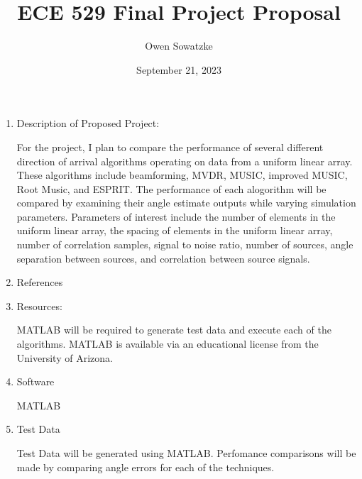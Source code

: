 \documentclass{article}
\title{ECE 529 Final Project Proposal}
\author{Owen Sowatzke}
\date{September 21, 2023}
\begin{document}
	\maketitle

	\begin{enumerate}
		\item Description of Proposed Project:
		
			For the project, I plan to compare the performance of several different direction of arrival algorithms operating on data from a uniform linear array. These algorithms include beamforming, MVDR, MUSIC, improved MUSIC, Root Music, and ESPRIT. The performance of each alogorithm will be compared by examining their angle estimate outputs while varying simulation parameters. Parameters of interest include the number of elements in the uniform linear array, the spacing of elements in the uniform linear array, number of correlation samples, signal to noise ratio, number of sources, angle separation between sources, and correlation between source signals. 
			
		\item References
		
		\nocite{doa_algorithms_raghu}
		\nocite{mvdr_montlouis}
		\nocite{capon_sanudin}
		\nocite{music_chowdhury}
		\nocite{improved_music_gupta}
		\nocite{root_music_esprit_patwari}
		\nocite{esprit_ning}
		
		\item Resources:
		
			MATLAB will be required to generate test data and execute each of the algorithms. MATLAB is available via an educational license from the University of Arizona.
			
		\item Software
		
			MATLAB
		
		\item Test Data	
			
			Test Data will be generated using MATLAB. Perfomance comparisons will be made by comparing angle errors for each of the techniques. 
	\end{enumerate}	
	
	\newpage
	{}
	
\end{document}
